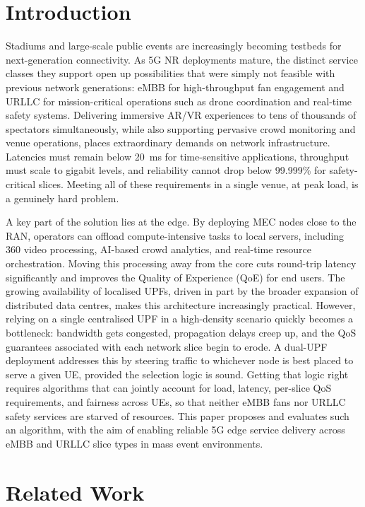 \documentclass[conference]{IEEEtran}
\begin{document}
\section{Introduction}

Stadiums and large-scale public events are increasingly becoming
testbeds for next-generation connectivity. As 5G NR deployments
mature, the distinct service classes they support open up
possibilities that were simply not feasible with previous network
generations: eMBB for high-throughput fan engagement and URLLC for
mission-critical operations such as drone coordination and
real-time safety systems. Delivering immersive AR/VR experiences to
tens of thousands of spectators simultaneously, while also
supporting pervasive crowd monitoring and venue operations,
places extraordinary demands on network infrastructure. Latencies
must remain below 20~ms for time-sensitive applications, throughput
must scale to gigabit levels, and reliability cannot drop below
99.999\% for safety-critical slices. Meeting all of these
requirements in a single venue, at peak load, is a genuinely hard
problem.

A key part of the solution lies at the edge. By deploying MEC
nodes close to the RAN, operators can offload compute-intensive
tasks to local servers, including 360\textdegree{} video
processing, AI-based crowd analytics, and real-time resource
orchestration. Moving this processing away from the core cuts
round-trip latency significantly and improves the Quality of
Experience (QoE) for end users. The growing availability of
localised UPFs, driven in part by the broader expansion of
distributed data centres, makes this architecture increasingly
practical. However, relying on a single centralised UPF in a
high-density scenario quickly becomes a bottleneck: bandwidth
gets congested, propagation delays creep up, and the QoS
guarantees associated with each network slice begin to erode.
A dual-UPF deployment addresses this by steering traffic to
whichever node is best placed to serve a given UE, provided
the selection logic is sound. Getting that logic right requires
algorithms that can jointly account for load, latency,
per-slice QoS requirements, and fairness across UEs, so that
neither eMBB fans nor URLLC safety services are starved of
resources. This paper proposes and evaluates such an algorithm,
with the aim of enabling reliable 5G edge service delivery across
eMBB and URLLC slice types in mass event environments.

\section{Related Work}
\end{document}
